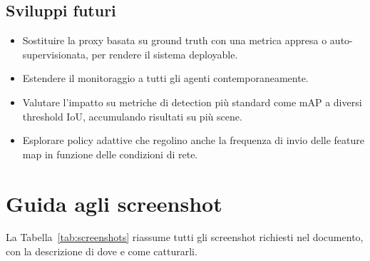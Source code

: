 \documentclass[12pt,a4paper]{article}
\begin{document}
\subsection{Sviluppi futuri}

\begin{itemize}
  \item Sostituire la proxy basata su ground truth con una metrica appresa o
        auto-supervisionata, per rendere il sistema deployable.
  \item Estendere il monitoraggio a tutti gli agenti contemporaneamente.
  \item Valutare l'impatto su metriche di detection pi\`u standard come mAP a
        diversi threshold IoU, accumulando risultati su pi\`u scene.
  \item Esplorare policy adattive che regolino anche la frequenza di invio delle
        feature map in funzione delle condizioni di rete.
\end{itemize}

\appendix
\section{Guida agli screenshot}

La Tabella~\ref{tab:screenshots} riassume tutti gli screenshot richiesti nel documento,
con la descrizione di dove e come catturarli.
\end{document}
